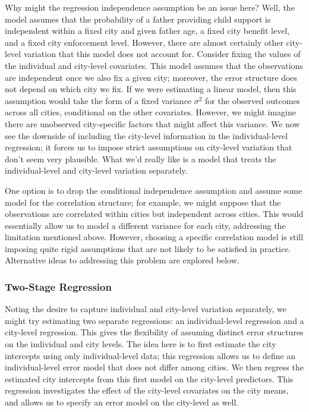 \documentclass[12pt]{article}
\begin{document}
Why might the regression independence assumption be an issue here? Well, the model assumes that the probability of a father providing 
child support is independent within a fixed city and given father age, a fixed city benefit level, and a fixed city enforcement level. However, there are almost certainly other city-level variation that this model 
does not account for. Consider fixing the values of the individual and city-level covariates. This model assumes that the observations are independent once we also fix a given city; moreover, the error structure
does not depend on which city we fix. If we were estimating a linear model, then this assumption would take the form of a fixed variance $\sigma^2$ for the observed outcomes across all cities, conditional 
on the other covariates. However, we might imagine there are unobserved city-specific factors that might affect this variance. We now see the downside of including the city-level information in the individual-level 
regression; it forces us to impose strict assumptions on city-level variation that don't seem very plausible. What we'd really like is a model that treats the individual-level and city-level variation separately. 

One option is to drop the conditional independence assumption and assume some model for the correlation structure; for example, we might suppose that the observations are correlated within cities but independent
across cities. This would essentially allow us to model a different variance for each city, addressing the limitation mentioned above. However, choosing a specific correlation model is still imposing quite rigid assumptions
that are not likely to be satisfied in practice. Alternative ideas to addressing this problem are explored below. 

\subsubsection{Two-Stage Regression}
Noting the desire to capture individual and city-level variation separately, we might try estimating two separate regressions: an individual-level regression and a city-level regression. This gives the flexibility
of assuming distinct error structures on the individual and city levels. The idea here is to first estimate the city intercepts using only individual-level data; this regression allows us to define an individual-level 
error model that does not differ among cities. We then regress the estimated city intercepts from this first model on the city-level predictors. This regression investigates the effect of the city-level covariates on 
the city means, and allows us to specify an error model on the city-level as well. 
\end{document}
